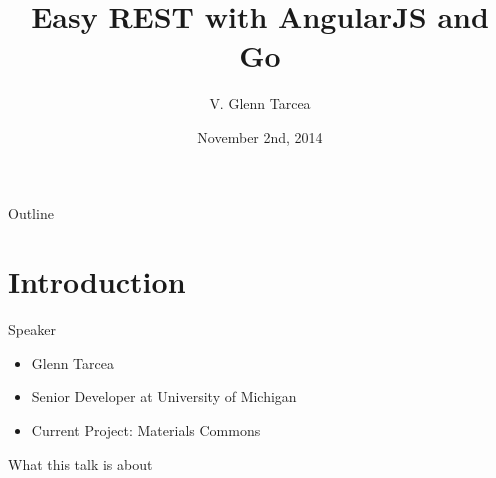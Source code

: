 \documentclass[presentation]{beamer}
\author{V. Glenn Tarcea}
\date{November 2nd, 2014}
\title{Easy REST with AngularJS and Go}
\begin{document}
\maketitle
\begin{frame}{Outline}
\tableofcontents
\end{frame}


\section{Introduction}
\label{sec-1}

\begin{frame}[label=sec-1-1]{Speaker}
\begin{itemize}
\item Glenn Tarcea
\item Senior Developer at University of Michigan
\item Current Project: Materials Commons
\end{itemize}
\end{frame}

\begin{frame}[label=sec-1-2]{What this talk is about}
\end{frame}
\end{document}
